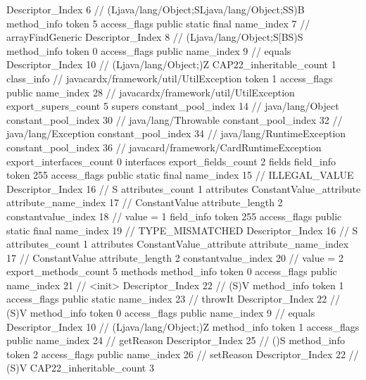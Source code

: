 {{{{{					Descriptor_Index	6		// (Ljava/lang/Object;SLjava/lang/Object;SS)B
				}
				method_info {
					token	5
					access_flags	public static final
					name_index	7		// arrayFindGeneric
					Descriptor_Index	8		// (Ljava/lang/Object;S[BS)S
				}
				method_info {
					token	0
					access_flags	public
					name_index	9		// equals
					Descriptor_Index	10		// (Ljava/lang/Object;)Z
				}
			}
			CAP22_inheritable_count	1
		}
		class_info {		// javacardx/framework/util/UtilException
			token	1
			access_flags	public
			name_index	28		// javacardx/framework/util/UtilException
			export_supers_count	5
			supers {
				constant_pool_index	14		// java/lang/Object
				constant_pool_index	30		// java/lang/Throwable
				constant_pool_index	32		// java/lang/Exception
				constant_pool_index	34		// java/lang/RuntimeException
				constant_pool_index	36		// javacard/framework/CardRuntimeException
			}
			export_interfaces_count	0
			interfaces {
			}
			export_fields_count	2
			fields {
			field_info {
				token	255
				access_flags	public static final
				name_index	15		// ILLEGAL_VALUE
				Descriptor_Index	16		// S
				attributes_count	1
				attributes {
				ConstantValue_attribute {
					attribute_name_index	17		// ConstantValue
					attribute_length	2
					constantvalue_index	18		// value = 1
				}
				}
			}
			field_info {
				token	255
				access_flags	public static final
				name_index	19		// TYPE_MISMATCHED
				Descriptor_Index	16		// S
				attributes_count	1
				attributes {
				ConstantValue_attribute {
					attribute_name_index	17		// ConstantValue
					attribute_length	2
					constantvalue_index	20		// value = 2
				}
				}
			}
			}
			export_methods_count	5
			methods {
				method_info {
					token	0
					access_flags	public
					name_index	21		// <init>
					Descriptor_Index	22		// (S)V
				}
				method_info {
					token	1
					access_flags	public static
					name_index	23		// throwIt
					Descriptor_Index	22		// (S)V
				}
				method_info {
					token	0
					access_flags	public
					name_index	9		// equals
					Descriptor_Index	10		// (Ljava/lang/Object;)Z
				}
				method_info {
					token	1
					access_flags	public
					name_index	24		// getReason
					Descriptor_Index	25		// ()S
				}
				method_info {
					token	2
					access_flags	public
					name_index	26		// setReason
					Descriptor_Index	22		// (S)V
				}
			}
			CAP22_inheritable_count	3
		}
	}
}
